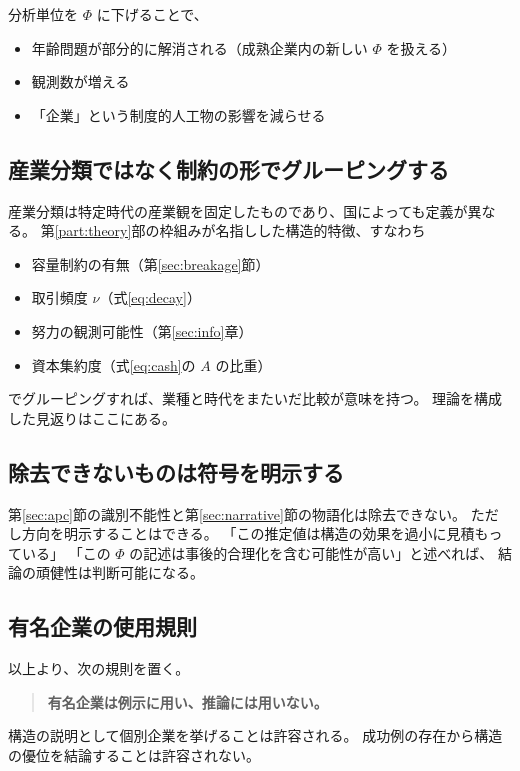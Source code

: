 分析単位を $\Phi$ に下げることで、
\begin{itemize}
\item 年齢問題が部分的に解消される（成熟企業内の新しい $\Phi$ を扱える）
\item 観測数が増える
\item 「企業」という制度的人工物の影響を減らせる
\end{itemize}

\subsection{産業分類ではなく制約の形でグルーピングする}

産業分類は特定時代の産業観を固定したものであり、国によっても定義が異なる。
第\ref{part:theory}部の枠組みが名指しした構造的特徴、すなわち
\begin{itemize}
\item 容量制約の有無（第\ref{sec:breakage}節）
\item 取引頻度 $\nu$（式\eqref{eq:decay}）
\item 努力の観測可能性（第\ref{sec:info}章）
\item 資本集約度（式\eqref{eq:cash}の $A$ の比重）
\end{itemize}
でグルーピングすれば、業種と時代をまたいだ比較が意味を持つ。
理論を構成した見返りはここにある。

\subsection{除去できないものは符号を明示する}

第\ref{sec:apc}節の識別不能性と第\ref{sec:narrative}節の物語化は除去できない。
ただし方向を明示することはできる。
「この推定値は構造の効果を過小に見積もっている」
「この $\Phi$ の記述は事後的合理化を含む可能性が高い」と述べれば、
結論の頑健性は判断可能になる。

\subsection{有名企業の使用規則}

以上より、次の規則を置く。
\begin{quote}
\textbf{有名企業は例示に用い、推論には用いない。}
\end{quote}
構造の説明として個別企業を挙げることは許容される。
成功例の存在から構造の優位を結論することは許容されない。

